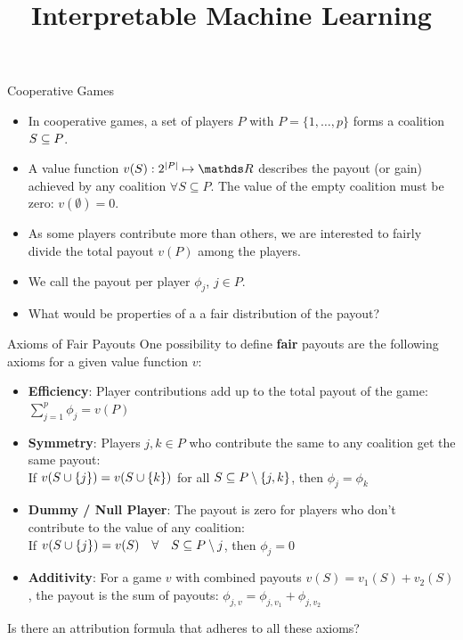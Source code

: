 \documentclass[11pt,compress,t,notes=noshow, xcolor=table]{beamer}
\title{Interpretable Machine Learning}
\institute{\href{https://compstat-lmu.github.io/lecture_i2ml/}{compstat-lmu.github.io/lecture\_i2ml}}
\date{}
\begin{document}

\begin{vbframe}{Cooperative Games}
\begin{itemize}
  \item In cooperative games, a set of players $P$ with $P = \{1, \hdots, p\}$ forms a coalition $\SsubP$. 
  \item A value function $v(S): 2^{|P|}\mapsto \R$ describes the payout (or gain) achieved by any coalition $\forall S \subseteq P$. The value of the empty coalition must be zero: $v(\emptyset) = 0$.
  \item As some players contribute more than others, we are interested to fairly divide the total payout $v(P)$ among the players.
  \item We call the payout per player $\phi_j$, $j \in P$.
  \item What would be properties of a a fair distribution of the payout?
\end{itemize}
\end{vbframe}


\begin{vbframe}{Axioms of Fair Payouts}
  One possibility to define \textbf{fair} payouts are the following axioms for a given value function $v$:
  \begin{itemize}
    \item \textbf{Efficiency}: Player contributions add up to the total payout of the game:
      $\sum\nolimits_{j=1}^p\phi_j = v(P)$
    \item \textbf{Symmetry}: Players $j,k \in P$ who contribute the same to any coalition get the same payout: \\
      If $v(\Scupj) = v(\Scupk)$ for all $\SsubP \setminus\{j,k\}$, then $\phi_j=\phi_k$
    \item \textbf{Dummy / Null Player}: The payout is zero for players who don't contribute to the value of any coalition: \\
      If $v(\Scupj)=v(S)\quad  \forall \quad \SsubP \setminus j$, then $\phi_j=0$
    \item \textbf{Additivity}: For a game $v$ with combined payouts $v(S) = v_1(S) + v_2(S)$, the payout is the sum of payouts: $\phi_{j,v} = \phi_{j,v_1} + \phi_{j, v_2}$
  \end{itemize}

  Is there an attribution formula that adheres to all these axioms?

\end{vbframe}
\end{document}
